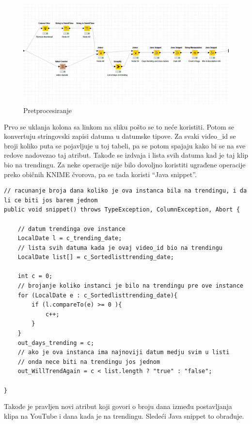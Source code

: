 \documentclass[a4paper]{article}
\theoremstyle{definition}
\begin{document}
\begin{figure}[H]
\begin{center}
    \includegraphics[width=1\textwidth]{preprocessing.png}
    \caption{Pretprocesiranje}
\end{center}
\end{figure}
Prvo se uklanja kolona sa linkom na sliku pošto se to neće koristiti. Potom se konvertuju stringovski zapisi datuma u datumske tipove.
Za svaki video\_id se broji koliko puta se pojavljuje u toj tabeli, pa se potom spajaju kako bi se na sve redove nadovezao taj atribut.
Takođe se izdvaja i lista svih datuma kad je taj klip bio na trendingu.
Za neke operacije nije bilo dovoljno koristiti ugrađene operacije preko običnih KNIME  čvorova, pa se tada koristi ``Java snippet''.

\begin{lstlisting}
// racunanje broja dana koliko je ova instanca bila na trendingu, i da li ce biti jos barem jednom
public void snippet() throws TypeException, ColumnException, Abort {

	// datum trendinga ove instance
	LocalDate l = c_trending_date;
	// lista svih datuma kada je ovaj video_id bio na trendingu
	LocalDate list[] = c_Sortedlisttrending_date;

	int c = 0;
	// brojanje koliko instanci je bilo na trendingu pre ove instance
	for (LocalDate e : c_Sortedlisttrending_date){
		if (l.compareTo(e) >= 0 ){
			c++;
		}
	}
	out_days_trending = c;
	// ako je ova instanca ima najnoviji datum medju svim u listi
	// onda nece biti na trendingu jos jednom
	out_WillTrendAgain = c < list.length ? "true" : "false";

}

\end{lstlisting}


Takođe je pravljen novi atribut koji govori o broju dana između postavljanja klipa na YouTube i dana kada je na trendingu.
Sledeći Java snippet to obrađuje.
\end{document}
